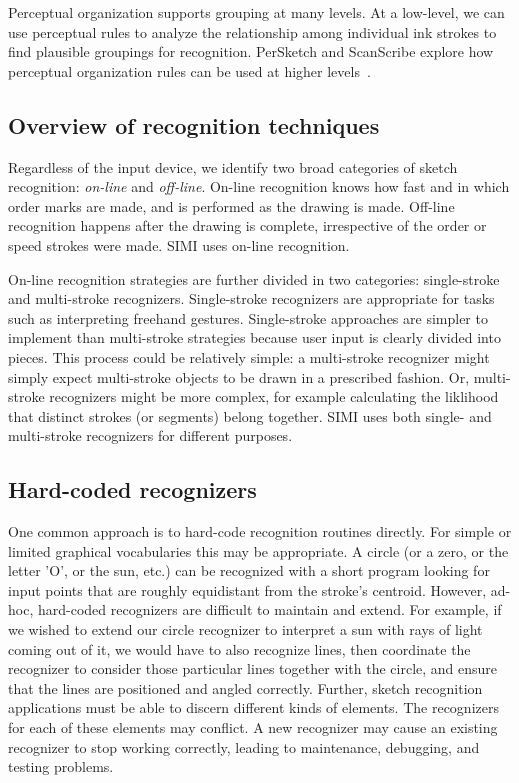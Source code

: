 

Perceptual organization supports grouping at many levels. At a
low-level, we can use perceptual rules to analyze the relationship
among individual ink strokes to find plausible groupings for
recognition. PerSketch and ScanScribe explore how perceptual
organization rules can be used at higher
levels~\cite{saund-persketch,saund-perceptual}. 

\subsection{Overview of recognition techniques}
\label{sec:recognition-techniques}

Regardless of the input device, we identify two broad categories of
sketch recognition: \textit{on-line} and \textit{off-line}. On-line
recognition knows how fast and in which order marks are made, and is
performed as the drawing is made. Off-line recognition happens after
the drawing is complete, irrespective of the order or speed strokes
were made. SIMI uses on-line recognition.

On-line recognition strategies are further divided in two categories:
single-stroke and multi-stroke recognizers. Single-stroke recognizers
are appropriate for tasks such as interpreting freehand
gestures. Single-stroke approaches are simpler to implement than
multi-stroke strategies because user input is clearly divided into
pieces. This process could be relatively simple: a multi-stroke
recognizer might simply expect multi-stroke objects to be drawn in a
prescribed fashion. Or, multi-stroke recognizers might be more
complex, for example calculating the liklihood that distinct strokes
(or segments) belong together. SIMI uses both single- and multi-stroke
recognizers for different purposes.

\subsection{Hard-coded recognizers}
\label{sec:recognition-hard-coded}

One common approach is to hard-code recognition routines directly. For
simple or limited graphical vocabularies this may be appropriate. A
circle (or a zero, or the letter 'O', or the sun, etc.)  can be
recognized with a short program looking for input points that are
roughly equidistant from the stroke's centroid. However, ad-hoc,
hard-coded recognizers are difficult to maintain and extend. For
example, if we wished to extend our circle recognizer to interpret a
sun with rays of light coming out of it, we would have to also
recognize lines, then coordinate the recognizer to consider those
particular lines together with the circle, and ensure that the lines
are positioned and angled correctly. Further, sketch recognition
applications must be able to discern different kinds of elements. The
recognizers for each of these elements may conflict. A new recognizer
may cause an existing recognizer to stop working correctly, leading to
maintenance, debugging, and testing problems.

